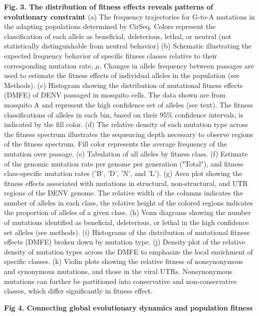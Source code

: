 \documentclass[
]{article}
\begin{document}
\textbf{Fig. 3. The distribution of fitness effects reveals patterns of
evolutionary constraint} (a) The frequency trajectories for G-to-A
mutations in the adapting populations determined by CirSeq. Colors
represent the classification of each allele as beneficial, deleterious,
lethal, or neutral (not statistically distinguishable from neutral
behavior) (b) Schematic illustrating the expected frequency behavior of
specific fitness classes relative to their corresponding mutation rate,
\(\mu\). Changes in allele frequency between passages are used to
estimate the fitness effects of individual allele­­s in the population
(see Methods). (c) Histogram showing the distribution of mutational
fitness effects (DMFE) of DENV passaged in mosquito cells. The data
shown are from mosquito A and represent the high confidence set of
alleles (see text). The fitness classifications of alleles in each bin,
based on their 95\% confidence intervals, is indicated by the fill
color. (d) The relative density of each mutation type across the fitness
spectrum illustrates the sequencing depth necessary to observe regions
of the fitness spectrum. Fill color represents the average frequency of
the mutation over passage. (e) Tabulation of all alleles by fitness
class. (f) Estimate of the genomic mutation rate per genome per
generation ("Total"), and fitness class-specific mutation rates ('B',
'D', 'N', and 'L'). (g) Area plot showing the fitness effects associated
with mutations in structural, non-structural, and UTR regions of the
DENV genome. The relative width of the columns indicates the number of
alleles in each class, the relative height of the colored regions
indicates the proportion of alleles of a given class. (h) Venn diagrams
showing the number of mutations identified as beneficial, deleterious,
or lethal in the high confidence set alleles (see methods). (i)
Histograms of the distribution of mutational fitness effects (DMFE)
broken down by mutation type. (j) Density plot of the relative density
of mutation types across the DMFE to emphasize the local enrichment of
specific classes. (k) Violin plots showing the relative fitness of
nonsynonymous and synonymous mutations, and those in the viral UTRs.
Nonsynonymous mutations can further be partitioned into conservative and
non-conservative classes, which differ significantly in fitness effect.

\textbf{Fig 4. Connecting global evolutionary dynamics and population
fitness}
\end{document}
